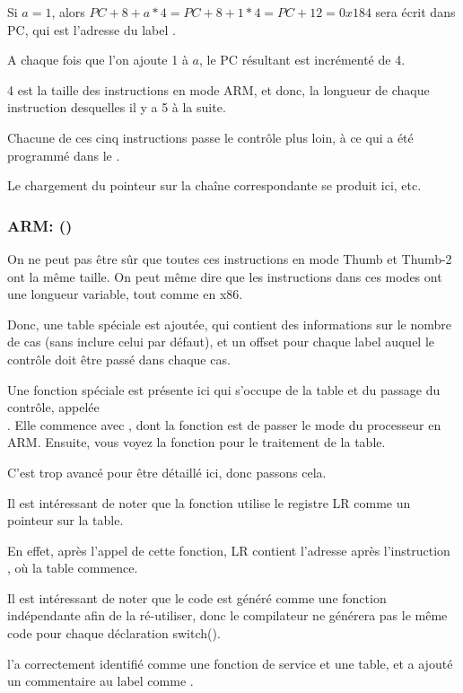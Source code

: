 Si $a=1$, alors $PC+8+a*4 = PC+8+1*4 = PC+12 = 0x184$ sera écrit dans \ac{PC}, qui
est l'adresse du label .

A chaque fois que l'on ajoute 1 à $a$, le \ac{PC} résultant est incrémenté de
4.

4 est la taille des instructions en mode ARM, et donc, la longueur de chaque instruction
 desquelles il y a 5 à la suite.

Chacune de ces cinq instructions  passe le contrôle plus loin, à ce qui a
été programmé dans le .

Le chargement du pointeur sur la chaîne correspondante se produit ici, etc.

\subsubsection{ARM: \OptimizingKeilVI (\ThumbMode)}




On ne peut pas être sûr que toutes ces instructions en mode Thumb et Thumb-2 ont
la même taille. On peut même dire que les instructions dans ces modes ont une longueur
variable, tout comme en x86.


Donc, une table spéciale est ajoutée, qui contient des informations sur le nombre
de cas (sans inclure celui par défaut), et un offset pour chaque label auquel le
contrôle doit être passé dans chaque cas.


Une fonction spéciale est présente ici qui s'occupe de la table et du passage du
contrôle, appelée\\ .
Elle commence avec , dont la fonction est de passer le mode du processeur
en ARM.
Ensuite, vous voyez la fonction pour le traitement de la table.

C'est trop avancé pour être détaillé ici, donc passons cela.


Il est intéressant de noter que la fonction utilise le registre \ac{LR} comme un
pointeur sur la table.

En effet, après l'appel de cette fonction, \ac{LR} contient l'adresse après l'instruction\\
, où la table commence.

Il est intéressant de noter que le code est généré comme une fonction indépendante
afin de la ré-utiliser, donc le compilateur ne générera pas le même code pour chaque
déclaration switch().

\IDA l'a correctement identifié comme une fonction de service et une table, et a
ajouté un commentaire au label comme .

